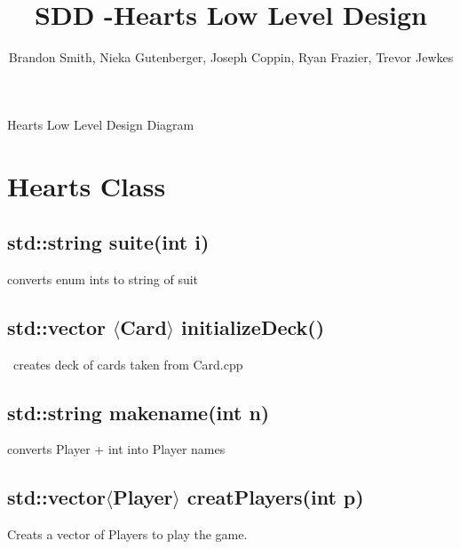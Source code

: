 \documentclass[]{scrartcl}
\title{SDD -Hearts Low Level Design}
\author{Brandon Smith, Nieka Gutenberger, Joseph Coppin, Ryan Frazier, Trevor Jewkes}
\begin{document}
\maketitle

	\noindent{}
\centerline{Hearts Low Level Design Diagram}




\section{Hearts Class}



\subsection{std::string suite(int i)}  
	converts enum ints to string of suit
\subsection{std::vector $\langle$Card$\rangle$ initializeDeck()} \
	creates deck of cards taken from Card.cpp
\subsection{std::string makename(int n) } 
	converts Player + int into Player names
\subsection{std::vector$\langle$Player$\rangle$  creatPlayers(int p) } 
	Creats a vector of Players to play the game.
\end{document}
